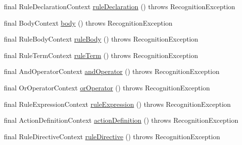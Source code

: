 \begin{DoxyCompactItemize}
\item 
final Rule\-Declaration\-Context \hyperlink{classit_1_1emarolab_1_1cagg_1_1core_1_1language_1_1parser_1_1ANTLRInterface_1_1ANTLRGenerated_1_1CAGGSyntaxDefinitionParser_a35164f12cdc041e8a5b86fdc8f7f7f89}{rule\-Declaration} ()  throws Recognition\-Exception 
\item 
final Body\-Context \hyperlink{classit_1_1emarolab_1_1cagg_1_1core_1_1language_1_1parser_1_1ANTLRInterface_1_1ANTLRGenerated_1_1CAGGSyntaxDefinitionParser_a7232bf39783d6e581da7cb9b47875f40}{body} ()  throws Recognition\-Exception 
\item 
final Rule\-Body\-Context \hyperlink{classit_1_1emarolab_1_1cagg_1_1core_1_1language_1_1parser_1_1ANTLRInterface_1_1ANTLRGenerated_1_1CAGGSyntaxDefinitionParser_a886d5a15a8766509a8b63198f5200426}{rule\-Body} ()  throws Recognition\-Exception 
\item 
final Rule\-Term\-Context \hyperlink{classit_1_1emarolab_1_1cagg_1_1core_1_1language_1_1parser_1_1ANTLRInterface_1_1ANTLRGenerated_1_1CAGGSyntaxDefinitionParser_a41370d76a47e64ae1385f5737e557c1e}{rule\-Term} ()  throws Recognition\-Exception 
\item 
final And\-Operator\-Context \hyperlink{classit_1_1emarolab_1_1cagg_1_1core_1_1language_1_1parser_1_1ANTLRInterface_1_1ANTLRGenerated_1_1CAGGSyntaxDefinitionParser_a3a3693b00ba9b878d3f90c2a0e4a68fe}{and\-Operator} ()  throws Recognition\-Exception 
\item 
final Or\-Operator\-Context \hyperlink{classit_1_1emarolab_1_1cagg_1_1core_1_1language_1_1parser_1_1ANTLRInterface_1_1ANTLRGenerated_1_1CAGGSyntaxDefinitionParser_a4c2fd20fcdbd39d16fa8965c88c229c3}{or\-Operator} ()  throws Recognition\-Exception 
\item 
final Rule\-Expression\-Context \hyperlink{classit_1_1emarolab_1_1cagg_1_1core_1_1language_1_1parser_1_1ANTLRInterface_1_1ANTLRGenerated_1_1CAGGSyntaxDefinitionParser_add5c1152ccded7a4a9bc6b86b4058db5}{rule\-Expression} ()  throws Recognition\-Exception 
\item 
final Action\-Definition\-Context \hyperlink{classit_1_1emarolab_1_1cagg_1_1core_1_1language_1_1parser_1_1ANTLRInterface_1_1ANTLRGenerated_1_1CAGGSyntaxDefinitionParser_a69c729c67915e7417b417b2748302bd8}{action\-Definition} ()  throws Recognition\-Exception 
\item 
final Rule\-Directive\-Context \hyperlink{classit_1_1emarolab_1_1cagg_1_1core_1_1language_1_1parser_1_1ANTLRInterface_1_1ANTLRGenerated_1_1CAGGSyntaxDefinitionParser_ac2295d5b6d935f1afedbf92e3fdde951}{rule\-Directive} ()  throws Recognition\-Exception 

\end{DoxyCompactItemize}
